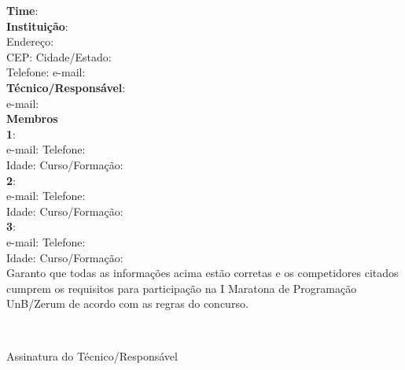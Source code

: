 \documentclass{UnBExam}%
\newcommand{\campo}[2][: ]{#2#1\hrulefill}%
\newcommand{\ca}[1]{\campo{\textbf{#1}}}%
\newcommand{\membro}[1]{%
\indent\ca{#1}\\
\indent\campo{e-mail}\campo{Telefone}\\
\indent\campo{Idade} \campo{Curso/Formação}\\
}%
\begin{document}
%
\vspace{0.5in}
\noindent
\ca{Time}\\
\ca{Instituição}\\
\indent\campo{Endereço}\\
\indent\campo{CEP} \campo{Cidade/Estado}\\
\indent\campo{Telefone} \campo{e-mail}\\
\ca{Técnico/Responsável}\\
\indent\campo{e-mail}\\
\textbf{Membros}\\
\membro{1}%
\membro{2}%
\membro{3}%

\noindent Garanto que todas as informações acima estão corretas e os competidores citados
cumprem os requisitos para participação na I Maratona de Programação UnB/Zerum de
acordo com as regras do concurso.

\vspace{\baselineskip}
\hspace{.5\textwidth}\hrulefill\\
\strut\hfill Assinatura do Técnico/Responsável
\vfill
\end{document}

